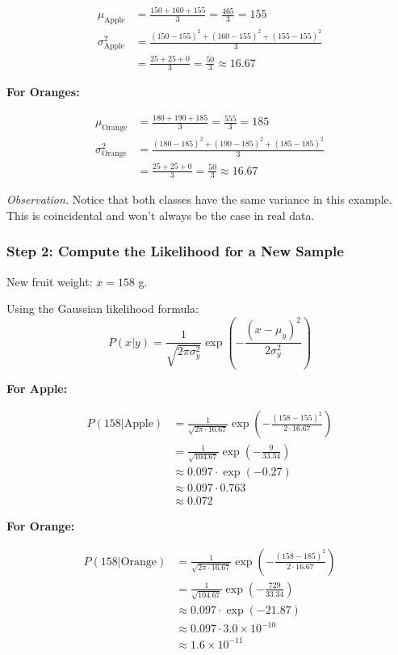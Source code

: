 \documentclass[a4paper]{article}
\theoremstyle{definition}
\begin{document}
\begin{align}
\mu_{\text{Apple}} &= \frac{150 + 160 + 155}{3} = \frac{465}{3} = 155 \\
\sigma^2_{\text{Apple}} &= \frac{(150-155)^2 + (160-155)^2 + (155-155)^2}{3} \\
&= \frac{25 + 25 + 0}{3} = \frac{50}{3} \approx 16.67
\end{align}

\textbf{For Oranges:}

\begin{align}
\mu_{\text{Orange}} &= \frac{180 + 190 + 185}{3} = \frac{555}{3} = 185 \\
\sigma^2_{\text{Orange}} &= \frac{(180-185)^2 + (190-185)^2 + (185-185)^2}{3} \\
&= \frac{25 + 25 + 0}{3} = \frac{50}{3} \approx 16.67
\end{align}

\emph{Observation.} Notice that both classes have the same variance in this
example. This is coincidental and won't always be the case in real data.

\subsubsection{Step 2: Compute the Likelihood for a New Sample}

New fruit weight: $x = 158$ g.

Using the Gaussian likelihood formula:
\[
P(x|y) = \frac{1}{\sqrt{2\pi\sigma_y^2}}
\exp\left(-\frac{(x-\mu_y)^2}{2\sigma_y^2}\right)
\]

\textbf{For Apple:}

\begin{align}
P(158|\text{Apple}) &= \frac{1}{\sqrt{2\pi \cdot 16.67}}
\exp\left(-\frac{(158-155)^2}{2 \cdot 16.67}\right) \\
&= \frac{1}{\sqrt{104.67}} \exp\left(-\frac{9}{33.34}\right) \\
&\approx 0.097 \cdot \exp(-0.27) \\
&\approx 0.097 \cdot 0.763 \\
&\approx 0.072
\end{align}


\textbf{For Orange:}

\begin{align}
P(158|\text{Orange}) &= \frac{1}{\sqrt{2\pi \cdot 16.67}}
\exp\left(-\frac{(158-185)^2}{2 \cdot 16.67}\right) \\
&= \frac{1}{\sqrt{104.67}} \exp\left(-\frac{729}{33.34}\right) \\
&\approx 0.097 \cdot \exp(-21.87) \\
&\approx 0.097 \cdot 3.0 \times 10^{-10} \\
&\approx 1.6 \times 10^{-11}
\end{align}
\end{document}
